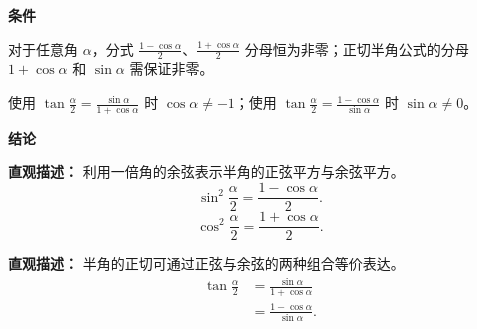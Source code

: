 \begin{statementbox}
	\textbf{\textcolor{CStatement}{条件}}
	\begin{description}[style=nextline, leftmargin=2.8em, labelsep=0.5em, itemsep=0.35em]
		\item[\textbf{\textcolor{CStatement}{条件1（分母非零约束）：}}] 对于任意角 $\alpha$，分式 $\frac{1-\cos\alpha}{2}$、$\frac{1+\cos\alpha}{2}$ 分母恒为非零；正切半角公式的分母 $1+\cos\alpha$ 和 $\sin\alpha$ 需保证非零。
		\item[\textbf{\textcolor{CStatement}{条件2（正切附加限制）：}}] 使用 $\tan\frac{\alpha}{2} = \frac{\sin\alpha}{1+\cos\alpha}$ 时 $\cos\alpha\neq -1$；使用 $\tan\frac{\alpha}{2} = \frac{1-\cos\alpha}{\sin\alpha}$ 时 $\sin\alpha\neq 0$。
	\end{description}

	\textbf{\textcolor{CStatement}{结论}}
	\begin{description}[style=nextline, leftmargin=2.8em, labelsep=0.5em, itemsep=0.45em]
		\item[\textbf{\textcolor{CStatement}{结论一（半角平方公式）：}}]
			\textbf{\textcolor{CStatement}{直观描述：}}
			利用一倍角的余弦表示半角的正弦平方与余弦平方。
			\[
				\sin^2\frac{\alpha}{2} = \frac{1-\cos\alpha}{2}.
			\]
			\[
				\cos^2\frac{\alpha}{2} = \frac{1+\cos\alpha}{2}.
			\]

		\item[\textbf{\textcolor{CStatement}{推广结论（正切半角形式）：}}]
			\textbf{\textcolor{CStatement}{直观描述：}}
			半角的正切可通过正弦与余弦的两种组合等价表达。
			\[
				\begin{aligned}
					\tan\frac{\alpha}{2} &= \frac{\sin\alpha}{1+\cos\alpha} \\
					&= \frac{1-\cos\alpha}{\sin\alpha}.
			\end{aligned}
			\]
	\end{description}

\end{statementbox}
